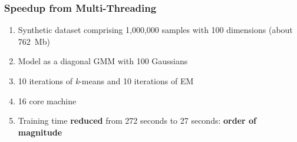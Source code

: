 \documentclass[usenames,dvipsnames]{beamer}
\begin{document}
\begin{frame}
\frametitle{Speedup from Multi-Threading}


\begin{enumerate}[{~~$\boldsymbol{\bullet}$}]

\item
Synthetic dataset comprising 1,000,000 samples with 100 dimensions  (about 762~Mb)
\vspace{0.5ex}

\item Model as a diagonal GMM with 100 Gaussians
\vspace{0.5ex}

\item 10 iterations of {\it k}-means and 10 iterations of EM
\vspace{0.5ex}

\item 16 core machine
\vspace{0.5ex}

\item Training time {\bf reduced} from 272 seconds to 27 seconds: {\bf order of magnitude}

\end{enumerate}




\end{frame}
\end{document}

